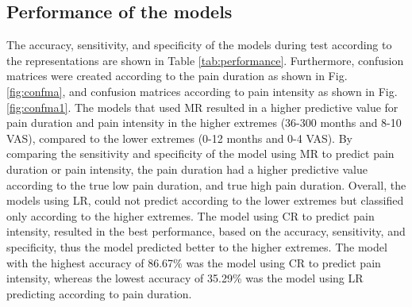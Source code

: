 \subsection{Performance of the models}
\vspace{-0.2cm}
The accuracy, sensitivity, and specificity of the models during test according to the representations are shown in Table \ref{tab:performance}. Furthermore, confusion matrices were created according to the pain duration as shown in Fig. \ref{fig:confma}, and confusion matrices according to pain intensity as shown in Fig. \ref{fig:confma1}.
The models that used MR resulted in a higher predictive value for pain duration and pain intensity in the higher extremes (36-300 months and 8-10 VAS), compared to the lower extremes (0-12 months and 0-4 VAS). By comparing the sensitivity and specificity of the model using MR to predict pain duration or pain intensity, the pain duration had a higher predictive value according to the true low pain duration, and true high pain duration.
Overall, the models using LR, could not predict according to the lower extremes but classified only according to the higher extremes.  
The model using CR to predict pain intensity, resulted in the best performance, based on the accuracy, sensitivity, and specificity, thus the model predicted better to the higher extremes. 
The model with the highest accuracy of 86.67\% was the model using CR to predict pain intensity, whereas the lowest accuracy of 35.29\% was the model using LR predicting according to pain duration. 